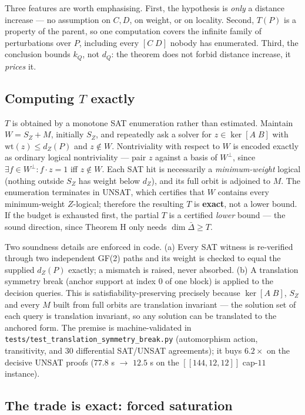 \documentclass[11pt]{article}
\newcommand{\nk}[1]{[\![#1]\!]}
\theoremstyle{plain}
\theoremstyle{remark}
\begin{document}
Three features are worth emphasising. First, the hypothesis is \emph{only} a distance
increase --- no assumption on $C,D$, on weight, or on locality. Second, $T(P)$ is a
property of the parent, so one computation covers the infinite family of perturbations
over $P$, including every $[C\;D]$ nobody has enumerated. Third, the conclusion bounds
$k_Q$, not $d_Q$: the theorem does not forbid distance increase, it \emph{prices} it.

\subsection{Computing \texorpdfstring{$T$}{T} exactly}\label{sec:Texact}

$T$ is obtained by a monotone SAT enumeration rather than estimated. Maintain
$W=S_Z+M$, initially $S_Z$, and repeatedly ask a solver for
$z\in\ker[A\;B]$ with $\mathrm{wt}(z)\le d_Z(P)$ and $z\notin W$. Nontriviality with
respect to $W$ is encoded exactly as ordinary logical nontriviality --- pair $z$ against a
basis of $W^{\perp}$, since $\exists f\in W^{\perp}: f\cdot z=1$ iff $z\notin W$. Each
SAT hit is necessarily a \emph{minimum-weight} logical (nothing outside $S_Z$ has weight below
$d_Z$), and its full orbit is adjoined to $M$. The enumeration terminates in UNSAT, which
certifies that $W$ contains every minimum-weight $Z$-logical; therefore the resulting $T$
is \textbf{exact}, not a lower bound. If the budget is exhausted first, the partial $T$ is a
certified \emph{lower} bound --- the sound direction, since Theorem H only needs
$\dim\bar\Delta\ge T$.

Two soundness details are enforced in code. (a) Every SAT witness is re-verified through
two independent GF(2) paths and its weight is checked to equal the supplied
$d_Z(P)$ exactly; a mismatch is raised, never absorbed. (b) A translation symmetry break
(anchor support at index $0$ of one block) is applied to the decision queries. This is
satisfiability-preserving precisely because $\ker[A\;B]$, $S_Z$ and every $M$ built from
full orbits are translation invariant --- the solution set of each query is translation
invariant, so any solution can be translated to the anchored form. The premise is
machine-validated in \texttt{tests/test\_translation\_symmetry\_break.py} (automorphism action,
transitivity, and $30$ differential SAT/UNSAT agreements); it buys $6.2\times$ on the
decisive UNSAT proofs ($77.8$ s $\to$ $12.5$ s on the $\nk{144,12,12}$ cap-$11$ instance).

\subsection{The trade is exact: forced saturation}\label{sec:Texact2}
\end{document}
